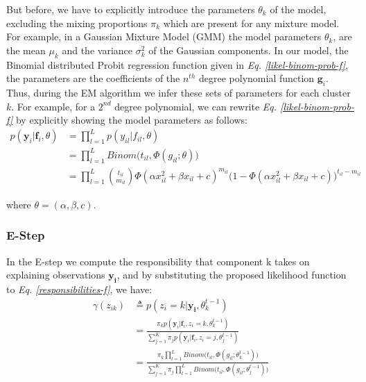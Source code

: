 But before, we have to explicitly introduce the parameters $\theta_{k}$ of the model, excluding the mixing proportions $\pi_{k}$ which are present for any mixture model. For example, in a Gaussian Mixture Model (GMM) the model parameters $\theta_{k}$, are the mean $\mu_{k}$ and the variance $\sigma_{k}^{2}$ of the Gaussian components. In our model, the Binomial distributed Probit regression function given in \emph{Eq. \ref{likel-binom-prob-f}}, the parameters are the coefficients of the $n^{th}$ degree polynomial function $\mathbf{g}_{i}$. Thus, during the EM algorithm we infer these sets of parameters for each cluster $k$. For example, for a $2^{nd}$ degree polynomial, we can rewrite \emph{Eq. \ref{likel-binom-prob-f}} by explicitly showing the model parameters as follows:
\begin{equation} \label{likel-binom-prob-example1-f}
  \begin{split}
	p(\mathbf{y}_{i}|\mathbf{f}_{i}, \theta) & = \prod_{l=1}^{L} p(y_{il}|f_{il}, \theta) \\
							 & = \prod_{l=1}^{L} Binom \big(t_{il}, \Phi(g_{il}; \theta)\big) \\
							 & = \prod_{l=1}^{L} \binom{t_{il}}{m_{il}} \Phi(\alpha x_{il}^{2} + \beta x_{il} + c)^{m_{il}} (1 - \Phi(\alpha x_{il}^{2} + \beta x_{il} + c)\big)^{t_{il} - m_{il}}
  \end{split}
\end{equation}

where $\theta = (\alpha, \beta, c)$.

\subsubsection{E-Step}
In the E-step we compute the responsibility that component k takes on explaining observations $\mathbf{y_{i}}$, and by substituting the proposed likelihood function to \emph{Eq. \ref{responsibilities-f}}, we have:
\begin{equation} \label{responsibilities-model-f}
  \begin{split}
	\gamma(z_{ik}) & \triangleq p(z_{i}=k|\mathbf{y_{i}},\theta_{k}^{t-1}) \\
				   & = \frac{\pi_{k}p(\mathbf{y}_{i}|\mathbf{f}_{i},z_{i}=k,\theta_{k}^{t-1})}{\sum\limits_{j=1}^{K} \pi_{j}p(\mathbf{y}_{i}|\mathbf{f}_{i},z_{i}=j,\theta_{j}^{t-1})} \\
				   & = \frac{\pi_{k} \prod\limits_{l=1}^{L} Binom \big(t_{il}, \Phi(g_{il}; \theta_{k}^{t-1})\big)} {\sum\limits_{j=1}^{K} \pi_{j} \prod\limits_{l=1}^{L} Binom \big(t_{il}, \Phi(g_{il}; \theta_{j}^{t-1})\big)}
  \end{split}
\end{equation}

